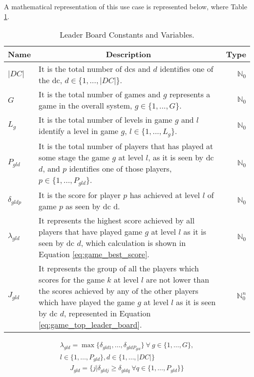 A mathematical representation of this use case is represented below, where Table \ref{tab:leaderBorad_constants_variables}.
\begin{table}[!ht]
	\begin{tabular}{|p{.8cm}|p{5.7cm}|r| }
		\hline
		\multicolumn{1}{|c|}{Name} & \multicolumn{1}{c|}{Description} & \multicolumn{1}{c|}{Type} \\
		\hline
		\hline
			$|DC|$ & It is the total number of \glspl{dc} and $d$ identifies one of the \gls{dc}, $d \in \{1,\dots, |DC|\}$. & $\mathbb{N}_{0}$ \\
		\hline
			$G$ & It is the total number of games and $g$ represents a game in the overall system, $g \in \{1,\dots, G\}$. & $\mathbb{N}_{0}$ \\
		\hline
			$L_{g}$ & It is the total number of levels in game $g$ and $l$ identify a level in game $g$, $l \in \{1,..., L_{g}\}$. & $\mathbb{N}_{0}$ \\
		\hline
			$P_{gld}$ & It is the total number of players that has played at some stage the game $g$ at level $l$, as it is seen by \gls{dc} $d$, and $p$ identifies one of those players, $p \in \{1,\dots, P_{gld}\}$. & $\mathbb{N}_{0}$ \\
		\hline
			$\delta_{gldp}$ & It is the score for player $p$ has achieved at level $l$ of game $p$ as seen by \gls{dc} d. & $\mathbb{N}_{0}$ \\
		\hline
			$\lambda_{gld}$ & It represents the highest score achieved by all players that have played game $g$ at level $l$ as it is seen by \gls{dc} $d$, which calculation is shown in Equation \ref{eq:game_best_score}. & $\mathbb{N}_{0}$ \\
		\hline
			$J_{gld}$ & It represents the group of all the players which scores for the game $k$ at level $l$ are not lower than the scores achieved by any of the other players which have played the game $g$ at level $l$ as it is seen by \gls{dc} $d$, represented in Equation \ref{eq:game_top_leader_board}. & $\mathbb{N}^{n}_{0}$ \\
		\hline
	\end{tabular}
			
	\caption{Leader Board Constants and Variables.}
	\label{tab:leaderBorad_constants_variables}
\end{table}
\begin{multline} \label{eq:game_best_score}
	\lambda_{gld} = \max\{\delta_{gld1},\dots, \delta_{gldP_{gld}}\} ~ \forall ~ g \in \{1,\dots, G\},\\ l \in \{1,\dots, P_{gld}\}, d \in \{1,\dots, |DC|\}
\end{multline}
\begin{multline} \label{eq:game_top_leader_board}
	J_{gld} = \{j | \delta_{gldj} \ge \delta_{gldq} ~ \forall q \in \{1,\dots, P_{gld}\}\}
\end{multline}


